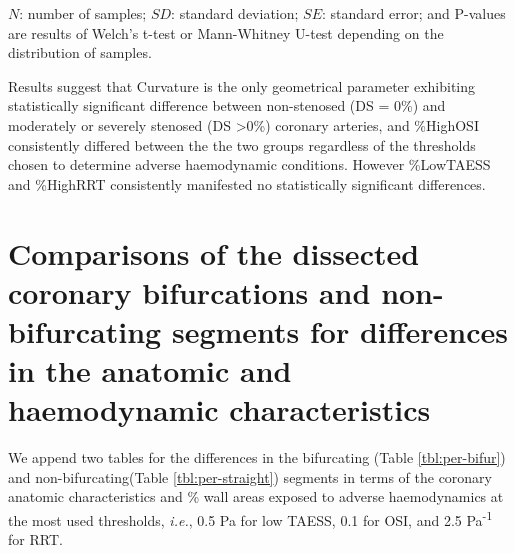 \documentclass[preprint,11pt,review]{elsarticle}
\begin{document}
\begin{table}
{\begin{threeparttable}
        \begin{tablenotes}
            \scriptsize
            \item $N$: number of samples; $SD$: standard deviation; $SE$: standard error; and P-values are results of Welch’s t-test or Mann-Whitney U-test depending on the distribution of samples. 
        \end{tablenotes}
        \label{tbl:rrt}
    \end{threeparttable}
}
\end{table}


Results suggest that Curvature is the only geometrical parameter exhibiting statistically significant difference between non-stenosed (DS = 0\%) and moderately or severely stenosed (DS \textgreater 0\%) coronary arteries, and \%HighOSI consistently differed between the the two groups regardless of the thresholds chosen to determine adverse haemodynamic conditions. However \%LowTAESS and \%HighRRT consistently manifested no statistically significant differences.

\section{Comparisons of the dissected coronary bifurcations and non-bifurcating segments for differences in the anatomic and haemodynamic characteristics}

We append two tables for the differences in the bifurcating (Table \ref{tbl:per-bifur}) and non-bifurcating(Table \ref{tbl:per-straight}) segments in terms of the coronary anatomic characteristics and \% wall areas exposed to adverse haemodynamics at the most used thresholds, \textit{i.e.}, 0.5 Pa for low TAESS, 0.1 for OSI, and 2.5 Pa\textsuperscript{-1} for RRT.
\end{document}
